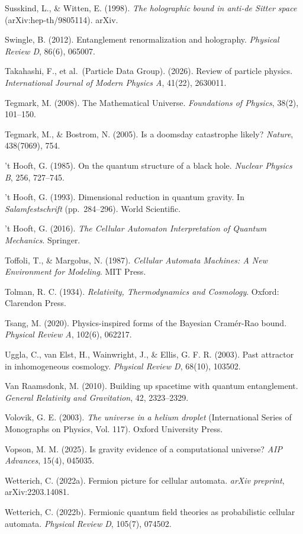 \documentclass[
]{article}
\begin{document}
Susskind, L., \& Witten, E. (1998). \emph{The holographic bound in
anti-de Sitter space} (arXiv:hep-th/9805114). arXiv.

Swingle, B. (2012). Entanglement renormalization and holography.
\emph{Physical Review D}, 86(6), 065007.

Takahashi, F., et al.~(Particle Data Group). (2026). Review of particle
physics. \emph{International Journal of Modern Physics A}, 41(22),
2630011.

Tegmark, M. (2008). The Mathematical Universe. \emph{Foundations of
Physics}, 38(2), 101--150.

Tegmark, M., \& Bostrom, N. (2005). Is a doomsday catastrophe likely?
\emph{Nature}, 438(7069), 754.

't Hooft, G. (1985). On the quantum structure of a black hole.
\emph{Nuclear Physics B}, 256, 727--745.

't Hooft, G. (1993). Dimensional reduction in quantum gravity. In
\emph{Salamfestschrift} (pp.~284--296). World Scientific.

't Hooft, G. (2016). \emph{The Cellular Automaton Interpretation of
Quantum Mechanics}. Springer.

Toffoli, T., \& Margolus, N. (1987). \emph{Cellular Automata Machines: A
New Environment for Modeling}. MIT Press.

Tolman, R. C. (1934). \emph{Relativity, Thermodynamics and Cosmology}.
Oxford: Clarendon Press.

Tsang, M. (2020). Physics-inspired forms of the Bayesian Cramér-Rao
bound. \emph{Physical Review A}, 102(6), 062217.

Uggla, C., van Elst, H., Wainwright, J., \& Ellis, G. F. R. (2003). Past
attractor in inhomogeneous cosmology. \emph{Physical Review D}, 68(10),
103502.

Van Raamsdonk, M. (2010). Building up spacetime with quantum
entanglement. \emph{General Relativity and Gravitation}, 42, 2323--2329.

Volovik, G. E. (2003). \emph{The universe in a helium droplet}
(International Series of Monographs on Physics, Vol. 117). Oxford
University Press.

Vopson, M. M. (2025). Is gravity evidence of a computational universe?
\emph{AIP Advances}, 15(4), 045035.

Wetterich, C. (2022a). Fermion picture for cellular automata.
\emph{arXiv preprint}, arXiv:2203.14081.

Wetterich, C. (2022b). Fermionic quantum field theories as probabilistic
cellular automata. \emph{Physical Review D}, 105(7), 074502.
\end{document}
